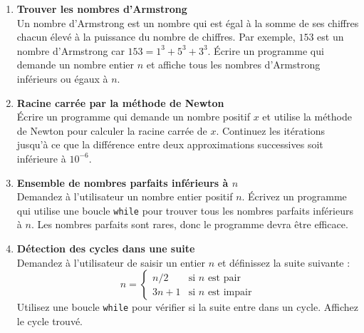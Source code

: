 \begin{enumerate}
    \item \textbf{Trouver les nombres d’Armstrong} \\
    Un nombre d’Armstrong est un nombre qui est égal à la somme de ses chiffres chacun élevé à la puissance du nombre de chiffres. Par exemple, $153$ est un nombre d’Armstrong car $153 = 1^3 + 5^3 + 3^3$. Écrire un programme qui demande un nombre entier $n$ et affiche tous les nombres d’Armstrong inférieurs ou égaux à $n$.
    
    \item \textbf{Racine carrée par la méthode de Newton} \\
    Écrire un programme qui demande un nombre positif $x$ et utilise la méthode de Newton pour calculer la racine carrée de $x$. Continuez les itérations jusqu'à ce que la différence entre deux approximations successives soit inférieure à $10^{-6}$.
    
    \item \textbf{Ensemble de nombres parfaits inférieurs à $n$} \\
    Demandez à l’utilisateur un nombre entier positif $n$. Écrivez un programme qui utilise une boucle \texttt{while} pour trouver tous les nombres parfaits inférieurs à $n$. Les nombres parfaits sont rares, donc le programme devra être efficace.
    
    \item \textbf{Détection des cycles dans une suite} \\
    Demandez à l'utilisateur de saisir un entier $n$ et définissez la suite suivante :
    \[
    n = 
    \begin{cases} 
      n/2 & \text{si } n \text{ est pair} \\
      3n + 1 & \text{si } n \text{ est impair}
    \end{cases}
    \]
    Utilisez une boucle \texttt{while} pour vérifier si la suite entre dans un cycle. Affichez le cycle trouvé.
    
\end{enumerate}
